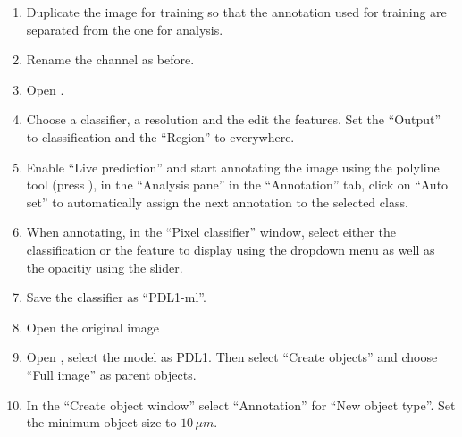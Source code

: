 \documentclass[a4paper,DIV=17,dvipsnames,headsepline]{scrartcl}
\begin{document}
\begin{enumerate}
\item Duplicate the image for training so that the annotation used for training are separated from the one for analysis.
\item Rename the channel as before.
\item Open .
\item Choose a classifier, a resolution and the edit the features. Set the ``Output'' to classification and the ``Region'' to everywhere.
\item Enable ``Live prediction'' and start annotating the image using the polyline tool (press ), in the ``Analysis pane'' in the ``Annotation'' tab, click on ``Auto set'' to automatically assign the next annotation to the selected class.
\item When annotating, in the ``Pixel classifier'' window, select either the classification or the feature to display using the dropdown menu as well as the opacitiy using the slider.
\item Save the classifier as ``PDL1-ml''.
\item Open the original image
\item Open , select the model as PDL1. Then select ``Create objects'' and choose ``Full image'' as parent objects.
\item In the ``Create object window'' select ``Annotation'' for ``New object type''. Set the minimum object size to $10\,\mu m$.
\end{enumerate}



     
        
\end{document}
